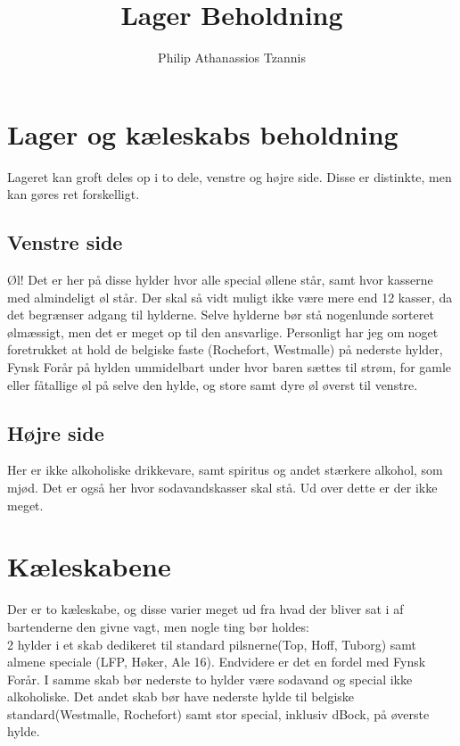 

\title{Lager Beholdning}
\author{Philip Athanassios Tzannis}
\date{}



\maketitle

\section{Lager og kæleskabs beholdning}
Lageret kan groft deles op i to dele, venstre og højre side. Disse er distinkte, men kan gøres ret forskelligt.
\subsection{Venstre side}
Øl! Det er her på disse hylder hvor alle special øllene står, samt hvor kasserne med almindeligt øl står. Der skal så vidt muligt ikke være mere end 12 kasser, da det begrænser adgang til hylderne. Selve hylderne bør stå nogenlunde sorteret ølmæssigt, men det er meget op til den ansvarlige. Personligt har jeg om noget foretrukket at hold de belgiske faste (Rochefort, Westmalle) på nederste hylder, Fynsk Forår på hylden ummidelbart under hvor baren sættes til strøm, for gamle eller fåtallige øl på selve den hylde, og store samt dyre øl øverst til venstre.
\subsection{Højre side}
Her er ikke alkoholiske drikkevare, samt spiritus og andet stærkere alkohol, som mjød. Det er også her hvor sodavandskasser skal stå. Ud over dette er der ikke meget.

\section{Kæleskabene}
Der er to kæleskabe, og disse varier meget ud fra hvad der bliver sat i af bartenderne den givne vagt, men nogle ting bør holdes:\\
2 hylder i et skab dedikeret til standard pilsnerne(Top, Hoff, Tuborg) samt almene speciale (LFP, Høker, Ale 16). Endvidere er det en fordel med Fynsk Forår. I samme skab bør nederste to hylder være sodavand og special ikke alkoholiske. Det andet skab bør have nederste hylde til belgiske standard(Westmalle, Rochefort) samt stor special, inklusiv dBock, på øverste hylde.

